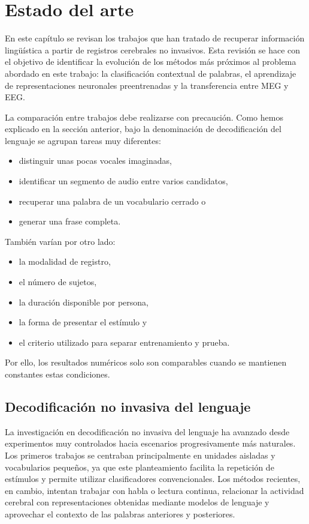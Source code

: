 \chapter{Estado del arte}

En este capítulo se revisan los trabajos que han tratado de recuperar información lingüística a partir de registros cerebrales no invasivos. Esta revisión se hace con el objetivo de identificar la evolución de los métodos más próximos al problema abordado en este trabajo: la clasificación contextual de palabras, el aprendizaje de representaciones neuronales preentrenadas y la transferencia entre MEG y EEG.

La comparación entre trabajos debe realizarse con precaución. Como hemos explicado en la sección anterior, bajo la denominación de decodificación del lenguaje se agrupan tareas muy diferentes:
\begin{itemize}
\setlength{\itemsep}{0pt}
\setlength{\parsep}{0pt}
\setlength{\topsep}{2pt}
\setlength{\partopsep}{0pt}
\item distinguir unas pocas vocales imaginadas, 
\item identificar un segmento de audio entre varios candidatos, 
\item recuperar una palabra de un vocabulario cerrado o 
\item generar una frase completa. 
\end{itemize} 
También varían por otro lado:
\begin{itemize}
\setlength{\itemsep}{0pt}
\setlength{\parsep}{0pt}
\setlength{\topsep}{2pt}
\setlength{\partopsep}{0pt}
\item la modalidad de registro, 
\item el número de sujetos, 
\item la duración disponible por persona, 
\item la forma de presentar el estímulo y 
\item el criterio utilizado para separar entrenamiento y prueba. 
\end{itemize} Por ello, los resultados numéricos solo son comparables cuando se mantienen constantes estas condiciones.

\section{Decodificación no invasiva del lenguaje}

La investigación en decodificación no invasiva del lenguaje ha avanzado desde experimentos muy controlados hacia escenarios progresivamente más naturales. Los primeros trabajos se centraban principalmente en unidades aisladas y vocabularios pequeños, ya que este planteamiento facilita la repetición de estímulos y permite utilizar clasificadores convencionales. Los métodos recientes, en cambio, intentan trabajar con habla o lectura continua, relacionar la actividad cerebral con representaciones obtenidas mediante modelos de lenguaje y aprovechar el contexto de las palabras anteriores y posteriores.

